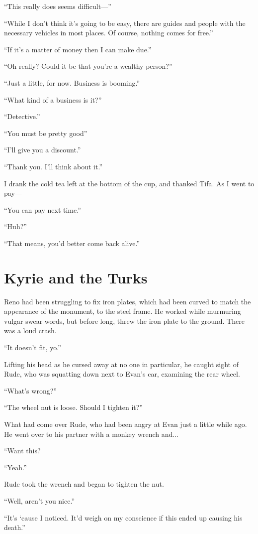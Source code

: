 \documentclass[oneside]{book}
\begin{document}
“This really does seems difficult—”

“While I don’t think it’s going to be easy, there are guides and people with the necessary vehicles in most places. Of course, nothing comes for free.”

“If it’s a matter of money then I can make due.”

“Oh really? Could it be that you’re a wealthy person?”

“Just a little, for now. Business is booming.”

“What kind of a business is it?”

“Detective.”

“You must be pretty good”

“I’ll give you a discount.”

“Thank you. I’ll think about it.”

I drank the cold tea left at the bottom of the cup, and thanked Tifa. As I went to pay—

“You can pay next time.”

“Huh?”

“That means, you’d better come back alive.”

\chapter{Kyrie and the Turks}
Reno had been struggling to fix iron plates, which had been curved to match the appearance of the monument, to the steel frame. He worked while murmuring vulgar swear words, but before long, threw the iron plate to the ground. There was a loud crash.

“It doesn’t fit, yo.”

Lifting his head as he cursed away at no one in particular, he caught sight of Rude, who was squatting down next to Evan’s car, examining the rear wheel.

“What’s wrong?”

“The wheel nut is loose. Should I tighten it?”

What had come over Rude, who had been angry at Evan just a little while ago. He went over to his partner with a monkey wrench and...

“Want this?

“Yeah.”

Rude took the wrench and began to tighten the nut.

“Well, aren’t you nice.”

“It’s ‘cause I noticed. It’d weigh on my conscience if this ended up causing his death.”
\end{document}
